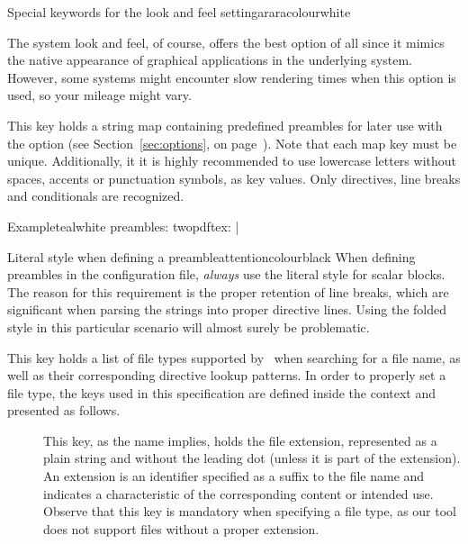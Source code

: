 \begin{description}
\begin{messagebox}{Special keywords for the look and feel setting}{araracolour}{\icok}{white}
\vspace{1.4em}

The system look and feel, of course, offers the best option of all since it mimics the native appearance of graphical applications in the underlying system. However, some systems might encounter slow rendering times when this option is used, so your mileage might vary.
\end{messagebox}

\item[\describecfn{O}{string map}{preambles}] This key holds a string map containing predefined preambles for later use with the  option (see Section~\ref{sec:options}, on page~\pageref{sec:options}). Note that each map key must be unique. Additionally, it it is highly recommended to use lowercase letters without spaces, accents or punctuation symbols, as key values. Only directives, line breaks and conditionals are recognized.

\begin{codebox}{Example}{teal}{\icnote}{white}
preambles:
  twopdftex: |
\end{codebox}

\begin{messagebox}{Literal style when defining a preamble}{attentioncolour}{\icattention}{black}
When defining preambles in the configuration file, \emph{always} use the literal style for scalar blocks. The reason for this requirement is the proper retention of line breaks, which are significant when parsing the strings into proper directive lines. Using the folded style in this particular scenario will almost surely be problematic.
\end{messagebox}

\item[\describecfn{O}{file type list}{filetypes}] This key holds a list of file types supported by \arara\ when searching for a file name, as well as their corresponding directive lookup patterns. In order to properly set a file type, the keys used in this specification are defined inside the  context and presented as follows.

\begin{description}
\item[] This key, as the name implies, holds the file extension, represented as a plain string and without the leading dot (unless it is part of the extension). An extension is an identifier specified as a suffix to the file name and indicates a characteristic of the corresponding content or intended use. Observe that this key is mandatory when specifying a file type, as our tool does not support files without a proper extension.


\end{description}
\end{description}
